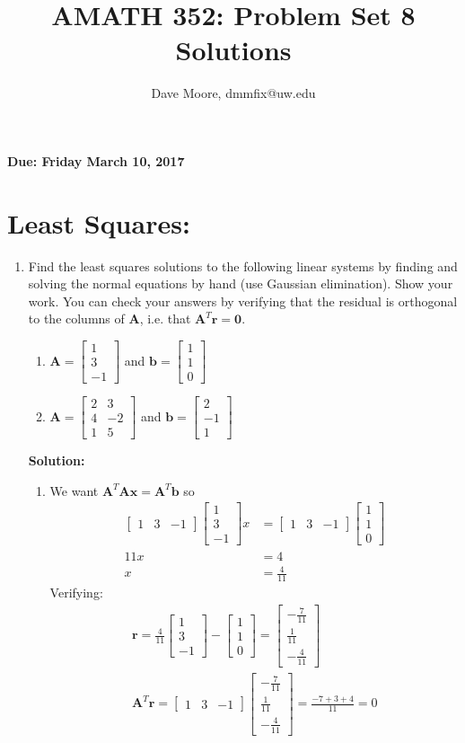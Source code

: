 \documentclass[]{article}
\title{AMATH 352: Problem Set 8 Solutions}
\author{Dave Moore, dmmfix@uw.edu}
\newcommand{\bbm}{\begin{bmatrix}}		%
\newcommand{\ebm}{\end{bmatrix}}		%
\newcommand{\x}{\bm{x}}					%
\newcommand{\A}{\bm{A}}					%
\newcommand{\solution}{\vskip 0.5cm \textbf{\large Solution:} \\}
\begin{document}
\maketitle
    {\Large \textbf{Due: Friday March 10, 2017}} \\


    \section*{Least Squares:}
    \begin{enumerate}
	\item Find the least squares solutions to the following linear systems by finding and solving the normal equations by hand (use Gaussian elimination). Show your work. You can check your answers by verifying that the residual is orthogonal to the columns of $\A$, i.e. that $\A^T\bm{r}=\bm{0}$.
	  \begin{enumerate}
	  \item $\A=\bbm 1\\3\\-1\ebm$ and $\bm{b}=\bbm 1\\1\\0\ebm$
	  \item $\A=\bbm 2&3\\4&-2\\1&5\ebm$ and $ \bm{b}=\bbm 2\\-1\\1\ebm$ 
	  \end{enumerate}

	  \solution
	  \begin{enumerate}
	  \item We want $\A^T\A\x = \A^T\bm{b}$ so
        \[\begin{split}
        \bbm 1&3&-1\ebm \bbm 1\\3\\-1\ebm x &= \bbm 1&3&-1\ebm \bbm 1\\1\\0\ebm \\
        11 x &= 4 \\
        x &= \frac{4}{11}
        \end{split}\]
        Verifying:
        \begin{gather*}
          \bm{r} = \frac{4}{11} \bbm 1\\3\\-1\ebm - \bbm 1\\1\\0\ebm = \bbm -\frac{7}{11} \\ \frac{1}{11} \\ -\frac{4}{11} \ebm \\
          \bm{A}^T\bm{r} = \bbm 1&3&-1\ebm \bbm -\frac{7}{11} \\ \frac{1}{11} \\ -\frac{4}{11} \ebm = \frac{-7 + 3 + 4}{11} = 0
        \end{gather*}
        

\end{enumerate}
\end{enumerate}
\end{document}
